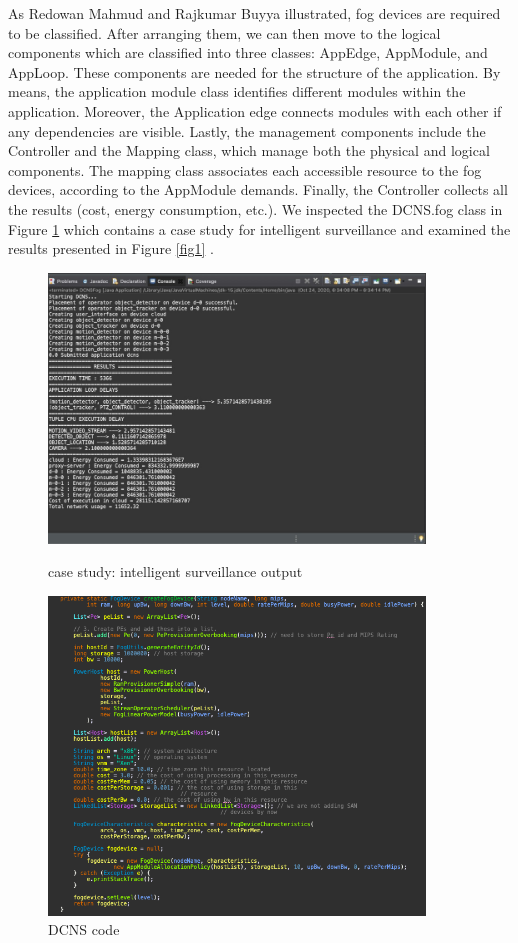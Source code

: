 \documentclass[12pt]{article}
\begin{document}
\newline 
As Redowan Mahmud and Rajkumar Buyya \cite{mahmud2019modelling} illustrated, fog devices are required to be classified. After arranging them, we can then move to the logical components which are classified into three classes: AppEdge, AppModule, and AppLoop. These components are needed for the structure of the application. By means, the application module class identifies different modules within the application. Moreover, the Application edge connects modules with each other if any dependencies are visible. Lastly, the management components include the Controller and the Mapping class, which manage both the physical and logical components. The mapping class associates each accessible resource to the fog devices, according to the AppModule demands. Finally, the Controller collects all the results (cost, energy consumption, etc.).
\break
We inspected the DCNS.fog class in Figure \ref{fig} which contains
a case study for intelligent surveillance and examined the results presented in Figure \ref{fig1} .
\newpage
\begin{figure}[h]
   \centering
    \includegraphics[width=10cm]{dcnsoutput.jpg}
    \caption{case study: intelligent surveillance output }
    \label{fig1}
    \newpage
    
     \centering
    \includegraphics[width=10cm]{DCNSS.jpg}
    \caption{DCNS code }
    \label{fig}
\end{figure}
\end{document}
